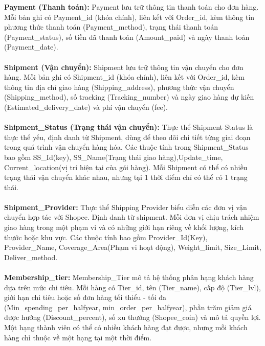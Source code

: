 \hspace*{2em} \textbf{Payment (Thanh toán):} Payment lưu trữ thông tin thanh toán cho đơn hàng. 
Mỗi bản ghi có Payment\_id (khóa chính), liên kết với Order\_id, 
kèm thông tin phương thức thanh toán (Payment\_method), trạng thái thanh toán (Payment\_status), 
số tiền đã thanh toán (Amount\_paid) và ngày thanh toán (Payment\_date). \\ \\
\hspace*{2em} \textbf{Shipment (Vận chuyển):} Shipment lưu trữ thông tin vận chuyển cho đơn hàng. 
Mỗi bản ghi có Shipment\_id (khóa chính), liên kết với Order\_id, kèm thông tin địa chỉ giao hàng (Shipping\_address), 
phương thức vận chuyển (Shipping\_method), số tracking (Tracking\_number) và 
ngày giao hàng dự kiến (Estimated\_delivery\_date) và phí vận chuyển (fee). \\ \\
\hspace*{2em} \textbf{Shipment\_Status (Trạng thái vận chuyển):} Thực thể Shipment Status là thực thể yếu, định danh từ Shipment, dùng để theo dõi chi tiết từng giai đoạn trong quá trình vận chuyển hàng hóa.
Các thuộc tính trong Shipment\_Status bao gồm SS\_Id(key), SS\_Name(Trạng thái giao hàng),Update\_time, Current\_location(vị trí hiện tại của gói hàng). 
Mỗi Shipment có thể có nhiều trạng thái vận chuyển khác nhau, nhưng tại 1 thời điểm chỉ có thể có 1 trạng thái.\\ \\
\hspace*{2em} \textbf{Shipment\_Provider:}  Thực thể Shipping Provider biểu diễn các đơn vị vận chuyển hợp tác với Shopee. 
Định danh từ shipment.  Mỗi đơn vị chịu trách nhiệm giao hàng trong một phạm vi và có những giới hạn riêng về khối lượng, kích thước hoặc khu vực. Các thuộc tính
bao gồm Provider\_Id(Key), Provider\_Name, Coverage\_Area(Phạm vi hoạt động), Weight\_limit, Size\_Limit, Deliver\_method.\\ \\
\hspace*{2em} \textbf{Membership\_tier:} Membership\_Tier mô tả hệ thống phân hạng khách hàng dựa trên mức chi tiêu. 
Mỗi hàng có Tier\_id, tên (Tier\_name), cấp độ (Tier\_lvl), 
giới hạn chi tiêu hoặc số đơn hàng tối thiểu - tối đa (Min\_spending\_per\_halfyear, min\_order\_per\_halfyear), 
phần trăm giảm giá được hưởng (Discount\_percent), số xu thưởng (Shopee\_coin) và mô tả quyền lợi. 
Một hạng thành viên có thể có nhiều khách hàng đạt được, nhưng mỗi khách hàng chỉ thuộc về một hạng tại một thời điểm. \\


